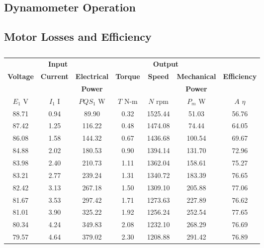 \documentclass{article}
\begin{document}
\subsection{Dynamometer Operation}

\subsection{Motor Losses and Efficiency}
\begin{table}[H]
  \centering
  \begin{tabular}{*{7}{c}}
    \multicolumn{3}{c}{\textbf{Input}} & \multicolumn{3}{c}{\textbf{Output}}
    & \\

    \textbf{Voltage} & \textbf{Current} & \textbf{Electrical} &
    \textbf{Torque}  & \textbf{Speed}   & \textbf{Mechanical} &
    \textbf{Efficiency} \\

    &                  & \textbf{Power}      &
    &                  & \textbf{Power}
    & \\

    $E_1$ V          & $I_1$ I          & $PQS_1$ W           &
    $T$ N-m          & $N$ rpm          & $P_{m}$ W           &
    $A$ $\eta$ \\

    \hline

    88.71 & 0.94 &  89.90 & 0.32 & 1525.44 &  51.03 & 56.76 \\
    87.42 & 1.25 & 116.22 & 0.48 & 1474.08 &  74.44 & 64.05 \\
    86.08 & 1.58 & 144.32 & 0.67 & 1436.68 & 100.54 & 69.67 \\
    84.88 & 2.02 & 180.53 & 0.90 & 1394.14 & 131.70 & 72.96 \\
    83.98 & 2.40 & 210.73 & 1.11 & 1362.04 & 158.61 & 75.27 \\
    83.21 & 2.77 & 239.24 & 1.31 & 1340.72 & 183.39 & 76.65 \\
    82.42 & 3.13 & 267.18 & 1.50 & 1309.10 & 205.88 & 77.06 \\
    81.67 & 3.53 & 297.42 & 1.71 & 1273.63 & 227.89 & 76.62 \\
    81.01 & 3.90 & 325.22 & 1.92 & 1256.24 & 252.54 & 77.65 \\
    80.34 & 4.24 & 349.83 & 2.08 & 1232.10 & 268.29 & 76.69 \\
    79.57 & 4.64 & 379.02 & 2.30 & 1208.88 & 291.42 & 76.89 \\
  \end{tabular}
  \caption{}
  \label{}
\end{table}
\end{document}
